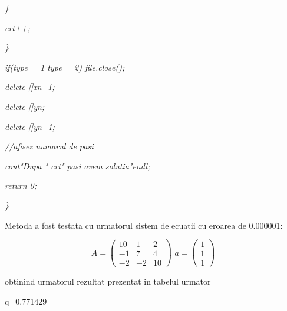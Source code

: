 \documentclass[a4paper,twoside]{book}
\begin{document}
\textit{\qquad \qquad \}}

\textit{\qquad \qquad crt++;}

\textit{\qquad \}}

\textit{\qquad if(type==1 \TEXTsymbol{\vert}\TEXTsymbol{\vert} type==2)
file.close();}

\textit{\qquad delete []xn\_1;}

\textit{\qquad delete []yn;}

\textit{\qquad delete []yn\_1;}

\textit{\qquad //afisez numarul de pasi}

\textit{\qquad cout\TEXTsymbol{<}\TEXTsymbol{<}"Dupa "\TEXTsymbol{<}%
\TEXTsymbol{<}crt\TEXTsymbol{<}\TEXTsymbol{<}" pasi avem solutia"\TEXTsymbol{%
<}\TEXTsymbol{<}endl;}

\textit{\qquad return 0;}

\textit{\}}

Metoda a fost testata cu urmatorul sistem de ecuatii cu eroarea de 0.000001:

\begin{equation*}
A=\left( 
\begin{array}{ccc}
10 & 1 & 2 \\ 
-1 & 7 & 4 \\ 
-2 & -2 & 10%
\end{array}%
\right) \,\,a=\left( 
\begin{array}{c}
1 \\ 
1 \\ 
1%
\end{array}%
\right)
\end{equation*}

obtinind urmatorul rezultat prezentat in tabelul urmator

q=0.771429
\end{document}
